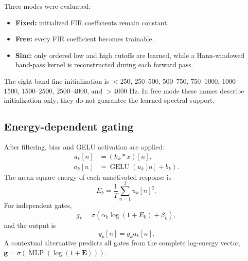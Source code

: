 \documentclass[10pt,twocolumn]{article}
\newcommand{\vect}[1]{\boldsymbol{#1}}
\begin{document}
Three modes were evaluated:
\begin{itemize}
  \item \textbf{Fixed:} initialized FIR coefficients remain constant.
  \item \textbf{Free:} every FIR coefficient becomes trainable.
  \item \textbf{Sinc:} only ordered low and high cutoffs are learned, while a
        Hann-windowed band-pass kernel is reconstructed during each forward
        pass.
\end{itemize}

The eight-band fine initialization is
$<250$, $250$--$500$, $500$--$750$, $750$--$1000$,
$1000$--$1500$, $1500$--$2500$, $2500$--$4000$, and $>4000$ Hz.
In free mode these names describe initialization only; they do not guarantee
the learned spectral support.

\subsection{Energy-dependent gating}

After filtering, bias and GELU activation are applied:
\begin{align}
  u_k[n] &= (h_k*x)[n],\\
  a_k[n] &= \operatorname{GELU}(u_k[n]+b_k).
\end{align}
The mean-square energy of each unactivated response is
\begin{equation}
  E_k=\frac{1}{T}\sum_{n=1}^{T}u_k[n]^2.
  \label{eq:energy}
\end{equation}
For independent gates,
\begin{equation}
  g_k=\sigma\!\left(\alpha_k\log(1+E_k)+\beta_k\right),
  \label{eq:gate}
\end{equation}
and the output is
\begin{equation}
  y_k[n]=g_k a_k[n].
  \label{eq:output}
\end{equation}
A contextual alternative predicts all gates from the complete log-energy
vector, $\vect{g}=\sigma(\operatorname{MLP}(\log(1+\vect{E})))$.
\end{document}
